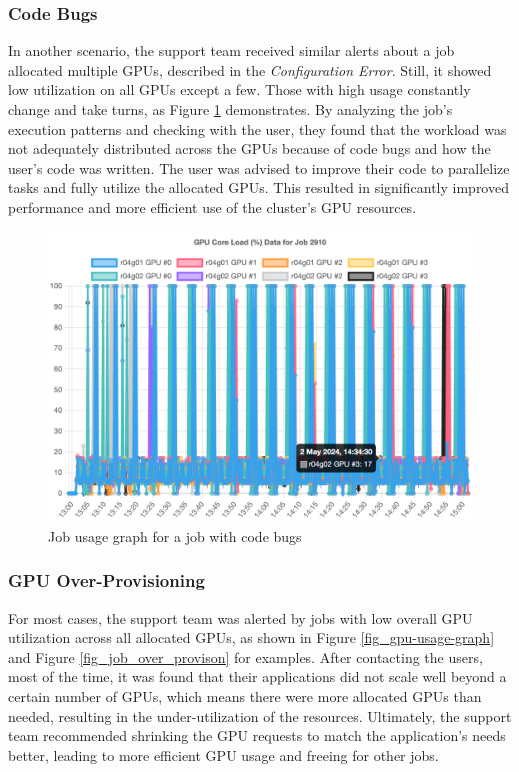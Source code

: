 \subsubsection{Code Bugs}
In another scenario, the support team received similar alerts about a job allocated multiple GPUs, described in the \textit{Configuration Error}. Still, it showed low utilization on all GPUs except a few. Those with high usage constantly change and take turns, as Figure \ref{fig_job_code_bugs} demonstrates. By analyzing the job's execution patterns and checking with the user, they found that the workload was not adequately distributed across the GPUs because of code bugs and how the user's code was written. The user was advised to improve their code to parallelize tasks and fully utilize the allocated GPUs. This resulted in significantly improved performance and more efficient use of the cluster's GPU resources.

\begin{figure}[H]
    \centering
    \includegraphics[width=1\textwidth]{figures/job-code-bugs.png}
    \caption{Job usage graph for a job with code bugs}
    \label{fig_job_code_bugs}
\end{figure}

\subsubsection{GPU Over-Provisioning}
For most cases, the support team was alerted by jobs with low overall GPU utilization across all allocated GPUs, as shown in Figure \ref{fig_gpu-usage-graph} and Figure \ref{fig_job_over_provison} for examples. After contacting the users, most of the time, it was found that their applications did not scale well beyond a certain number of GPUs, which means there were more allocated GPUs than needed, resulting in the under-utilization of the resources. Ultimately, the support team recommended shrinking the GPU requests to match the application's needs better, leading to more efficient GPU usage and freeing for other jobs.

